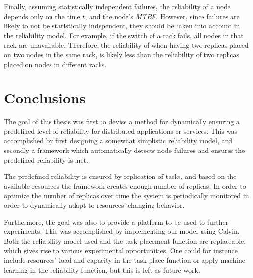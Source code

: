 \documentclass{cslthse-msc}
\begin{document}
Finally, assuming statistically independent failures, the reliability of a node depends only on the time $t$, and the node's \emph{MTBF}. However, since failures are likely to not be statistically independent, they should be taken into account in the reliability model. For example, if the switch of a rack fails, all nodes in that rack are unavailable. Therefore, the reliability of when having two replicas placed on two nodes in the same rack, is likely less than the reliability of two replicas placed on nodes in different racks.


\chapter{Conclusions} \label{ch:conclusions}
The goal of this thesis was first to devise a method for dynamically ensuring a predefined level of reliability for distributed applications or services. This was accomplished by first designing a somewhat simplistic reliability model, and secondly a framework which automatically detects node failures and ensures the predefined reliability is met. 

The predefined reliability is ensured by replication of tasks, and based on the available resources the framework creates enough number of replicas. In order to optimize the number of replicas over time the system is periodically monitored in order to dynamically adapt to resources' changing behavior.

Furthermore, the goal was also to provide a platform to be used to further experiments. This was accomplished by implementing our model using Calvin. Both the reliability model used and the task placement function are replaceable, which gives rise to various experimental opportunities. One could for instance include resources' load and capacity in the task place function or apply machine learning in the reliability function, but this is left as future work.
\end{document}
